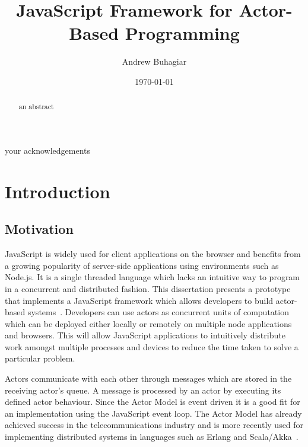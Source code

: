 \documentclass[12pt, a4paper]{report}
\theoremstyle{definition}
\theoremstyle{definition}%
\theoremstyle{definition}%
\theoremstyle{definition}%
\theoremstyle{definition}%
\theoremstyle{definition}%
\begin{document}
\title{JavaScript Framework for Actor-Based Programming}
\author{Andrew Buhagiar}
\date{\today}

\frontmatter


\begin{acknowledgements}
your acknowledgements
\end{acknowledgements}
       
\begin{abstract}
an abstract
\end{abstract}

\tableofcontents

\listoffigures

\listoftables



\mainmatter

\chapter{Introduction}
\section{Motivation}
JavaScript is widely used for client applications on the browser and benefits from a growing popularity of server-side applications using environments such as Node.js. It is a single threaded language which lacks an intuitive way to program in a concurrent and distributed fashion. This dissertation presents a prototype that implements a JavaScript framework which allows developers to build actor-based systems~\cite{hewitt1973session}\cite{43years}. Developers can use actors as concurrent units of computation which can be deployed either locally or remotely on multiple node applications and browsers. This will allow JavaScript applications to intuitively distribute work amongst multiple processes and devices to reduce the time taken to solve a particular problem.

Actors communicate with each other through messages which are stored in the receiving actor's queue. A message is processed by an actor by executing its defined actor behaviour. Since the Actor Model is event driven it is a good fit for an implementation using the JavaScript event loop. The Actor Model has already achieved success in the telecommunications industry and is more recently used for implementing distributed systems in languages such as Erlang and Scala/Akka~\cite{haller2012integration}.
\end{document}
